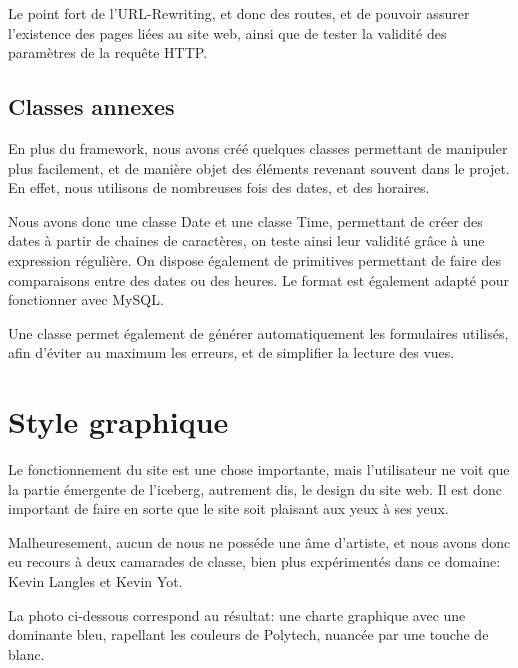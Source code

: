 Le point fort de l'URL-Rewriting, et donc des routes, et de pouvoir assurer l'existence des pages liées au site web,
ainsi que de tester la validité des paramètres de la requête HTTP.

        \subsection{Classes annexes}

En plus du framework, nous avons créé quelques classes permettant de manipuler plus facilement, et de manière objet
des éléments revenant souvent dans le projet. En effet, nous utilisons de nombreuses fois des dates, et des horaires.

Nous avons donc une classe Date et une classe Time, permettant de créer des dates à partir de chaines de caractères,
on teste ainsi leur validité grâce à une expression régulière. On dispose également de primitives permettant de
faire des comparaisons entre des dates ou des heures. Le format est également adapté pour fonctionner avec MySQL.

Une classe permet également de générer automatiquement les formulaires utilisés, afin d'éviter au maximum les erreurs,
et de simplifier la lecture des vues.




    \section{Style graphique}
Le fonctionnement du site est une chose importante, mais l'utilisateur ne voit que
la partie émergente de l'iceberg, autrement dis, le design du site web. Il est donc
important de faire en sorte que le site soit plaisant aux yeux à ses yeux. 

Malheuresement, aucun de nous ne posséde une âme d'artiste, et nous avons donc eu
recours à deux camarades de classe, bien plus expérimentés dans ce domaine: Kevin
Langles et Kevin Yot.

La photo ci-dessous correspond au résultat: une charte graphique avec une dominante 
bleu, rapellant les couleurs de Polytech, nuancée par une touche de blanc.

